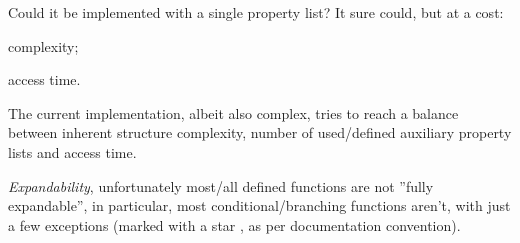 \documentclass[10pt]{article}
\begin{document}
\begin{tsremark}[Note:]
 Could it be implemented with a single property list? It sure could, but at a cost: 
\begin{enumerate*}   \item complexity;    \item access time.   \end{enumerate*}
The current implementation, albeit also complex, tries to reach a balance between inherent structure complexity, number of used/defined auxiliary property lists and access time.
\end{tsremark}

\begin{tsremark}
 \textsl{Expandability}, unfortunately most/all defined functions are not ''fully expandable'', in particular, most conditional/branching functions aren't, with just a few exceptions (marked with a star , as per  documentation convention).
 
\end{tsremark}
\end{document}
